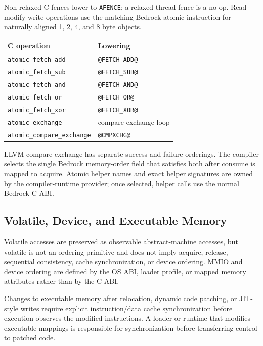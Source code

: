 Non-relaxed C fences lower to \texttt{AFENCE}; a relaxed thread fence is a
no-op. Read-modify-write operations use the matching Bedrock atomic instruction
for naturally aligned 1, 2, 4, and 8 byte objects.

\begingroup\footnotesize
\setlength{\tabcolsep}{2pt}
\begin{longtable}{@{}p{2.15in}p{3.35in}@{}}
\toprule
\textbf{C operation} & \textbf{Lowering}\\
\midrule
\endhead
\texttt{atomic\_fetch\_add} & \texttt{@FETCH_ADD@}\\
\texttt{atomic\_fetch\_sub} & \texttt{@FETCH_SUB@}\\
\texttt{atomic\_fetch\_and} & \texttt{@FETCH_AND@}\\
\texttt{atomic\_fetch\_or} & \texttt{@FETCH_OR@}\\
\texttt{atomic\_fetch\_xor} & \texttt{@FETCH_XOR@}\\
\texttt{atomic\_exchange} & compare-exchange loop\\
\texttt{atomic\_compare\_exchange} & \texttt{@CMPXCHG@}\\
\bottomrule
\end{longtable}
\endgroup

LLVM compare-exchange has separate success and failure orderings. The compiler
selects the single Bedrock memory-order field that satisfies both after consume
is mapped to acquire. Atomic helper names and exact helper signatures are owned
by the compiler-runtime provider; once selected, helper calls use the normal
Bedrock C ABI.

\subsection{Volatile, Device, and Executable Memory}
Volatile accesses are preserved as observable abstract-machine accesses, but
volatile is not an ordering primitive and does not imply acquire, release,
sequential consistency, cache synchronization, or device ordering. MMIO and
device ordering are defined by the OS ABI, loader profile, or mapped memory
attributes rather than by the C ABI.

Changes to executable memory after relocation, dynamic code patching, or
JIT-style writes require explicit instruction/data cache synchronization before
execution observes the modified instructions. A loader or runtime that modifies
executable mappings is responsible for synchronization before transferring
control to patched code.
